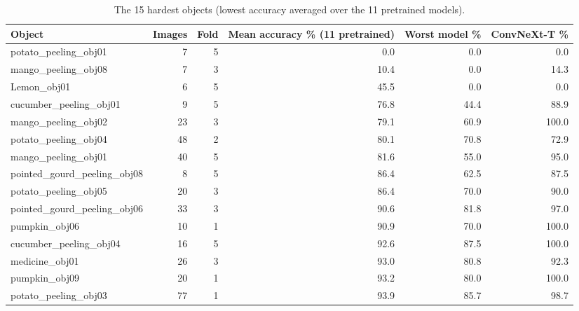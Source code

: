 \begin{table}
\caption{The 15 hardest objects (lowest accuracy averaged over the 11 pretrained models).}
\label{tab:table_hardest_objects}
\begin{tabular}{lrrrrr}
\toprule
Object & Images & Fold & Mean accuracy \% (11 pretrained) & Worst model \% & ConvNeXt-T \% \\
\midrule
potato\_peeling\_obj01 & 7 & 5 & 0.0 & 0.0 & 0.0 \\
mango\_peeling\_obj08 & 7 & 3 & 10.4 & 0.0 & 14.3 \\
Lemon\_obj01 & 6 & 5 & 45.5 & 0.0 & 0.0 \\
cucumber\_peeling\_obj01 & 9 & 5 & 76.8 & 44.4 & 88.9 \\
mango\_peeling\_obj02 & 23 & 3 & 79.1 & 60.9 & 100.0 \\
potato\_peeling\_obj04 & 48 & 2 & 80.1 & 70.8 & 72.9 \\
mango\_peeling\_obj01 & 40 & 5 & 81.6 & 55.0 & 95.0 \\
pointed\_gourd\_peeling\_obj08 & 8 & 5 & 86.4 & 62.5 & 87.5 \\
potato\_peeling\_obj05 & 20 & 3 & 86.4 & 70.0 & 90.0 \\
pointed\_gourd\_peeling\_obj06 & 33 & 3 & 90.6 & 81.8 & 97.0 \\
pumpkin\_obj06 & 10 & 1 & 90.9 & 70.0 & 100.0 \\
cucumber\_peeling\_obj04 & 16 & 5 & 92.6 & 87.5 & 100.0 \\
medicine\_obj01 & 26 & 3 & 93.0 & 80.8 & 92.3 \\
pumpkin\_obj09 & 20 & 1 & 93.2 & 80.0 & 100.0 \\
potato\_peeling\_obj03 & 77 & 1 & 93.9 & 85.7 & 98.7 \\
\bottomrule
\end{tabular}
\end{table}
